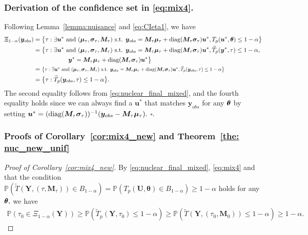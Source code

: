 \documentclass[12pt]{article}
\theoremstyle{shortspace}
\def\*#1{\bm{#1}}
\def\btheta{\mathop{\theta\kern-.45em\hbox{$\theta$}}\nolimits}
\def\P{\mathbb P}
\newcommand{\diag}{\hbox{diag}}
\begin{document}
\subsubsection{Derivation of the confidence set in \eqref{eq:mix4}.} \label{sec:27derivation}




 Following Lemma~\ref{lemma:nuisance} and  \eqref{eq:CIeta1}, we have
\begin{align}
\Xi_{1-\alpha}(\*y_{obs})   & = \big\{\tau: \exists \*u^* \mbox{ and } (\*\mu_\tau, \*
    \sigma_\tau, \*M_\tau)   \mbox{ s.t. } \*y_{obs} =\*M_{\tau} \*\mu_\tau + \diag(\*M_\tau  {\*\sigma_\tau}) \*u^*,  T_p(\*u^*,\btheta)\leq 1-\alpha\big\} \nonumber \\
    & = \big\{\tau: \exists \*u^* \mbox{ and } (\*\mu_\tau, \*
    \sigma_\tau, \*M_\tau)   \mbox{ s.t. } \*y_{obs} =\*M_{\tau} \*\mu_\tau + \diag(\*M_\tau  {\*\sigma_\tau}) \*u^*, \widetilde T_p(\*y^*,\tau)\leq 1-\alpha, \nonumber \\
    & \hspace{2cm} \*y^* =\*M_{\tau} \*\mu_\tau + \diag(\*M_\tau  {\*\sigma_\tau}) \*u^*\big\} \nonumber \\
     &  = \resizebox{0.87\hsize}{!}{$ \big\{\tau: \exists \*u^* \mbox{ and } (\*\mu_\tau, \*
    \sigma_\tau, \*M_\tau)   \mbox{ s.t. } \*y_{obs} =\*M_{\tau} \*\mu_\tau + \diag(\*M_\tau  {\*\sigma_\tau}) \*u^*, \widetilde T_p(\*y_{obs},\tau)\leq 1-\alpha\big\}$} \nonumber  \\
    & =  \big\{\tau: \widetilde T_p(\*y_{obs},\tau)\leq 1-\alpha \big\}. \nonumber
\end{align}
The second equality follows from \eqref{eq:nuclear_final_mixed},  and the fourth equality 
holds since we can always find a $\*u^*$ that matches $\*y_{obs}$ for any $\btheta$ by setting $\*u^* = (\diag(\*M_\tau  {\*\sigma_\tau}))^{-1} (\*y_{obs} -\*M_{\tau} \*\mu_\tau).$
\hfill $\square$.




\subsubsection{Proofs of Corollary~\ref{cor:mix4_new} and Theorem~\ref{the: nuc_new_unif}}
\label{sec:B3-1}



\begin{proof}[Proof of Corollary~\ref{cor:mix4_new}]
By \eqref{eq:nuclear_final_mixed}, \eqref{eq:mix4} and that the condition  $  \P(\widetilde T(\*Y, (\tau, \*M_\tau)) \in B_{1 -\alpha}) = \P(T_p(\*U, \*\theta) \in B_{1 -\alpha}) \geq 1- \alpha$  holds for any $\btheta,$ we have
    \begin{align*}
          \P(\tau_0 \in \Xi_{1-\alpha}(\*Y))   \geq   \P(\widetilde T_p(\*Y,\tau_0)\leq 1-\alpha )  \geq   \P(\widetilde T(\*Y,(\tau_0, \*M_{0}))\leq 1-\alpha ) \geq 1- \alpha.  
    \end{align*}
\end{proof}
\end{document}
